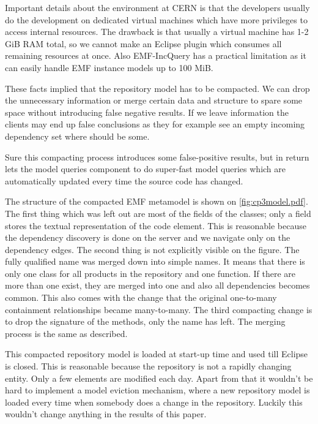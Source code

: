 Important details about the environment at CERN is that the developers usually
do the development on dedicated virtual machines which have more privileges to
access internal resources. The drawback is that usually a virtual machine has
1-2 GiB RAM total, so we cannot make an Eclipse plugin which consumes all
remaining resources at once. Also EMF-IncQuery has a practical limitation as it
can easily handle EMF instance models up to 100 MiB.

These facts implied that the repository model has to be compacted. We can drop
the unnecessary information or merge certain data and structure to spare some
space without introducing false negative results. If we leave information the
clients may end up false conclusions as they for example see an empty incoming
dependency set where should be some. 

Sure this compacting process introduces some false-positive results, but in 
return lets the model queries component to do super-fast model queries which
are automatically updated every time the source code has changed. 

The structure of the compacted EMF metamodel is shown on \autoref{fig:cp3model.pdf}.
The first thing which was left out are most of the fields of the classes; only a
 field stores the textual representation of the code element. This is
reasonable because the dependency discovery is done on the server and we
navigate only on the dependency edges. The second thing is not explicitly
visible on the figure. The fully qualified name was merged down into simple
names. It means that there is only one  class for all products in
the repository and one  function. If there are more than one
exist, they are merged into one and also all dependencies becomes common. This
also comes with the change that the original one-to-many containment
relationships became many-to-many. The third compacting change is to drop the
signature of the methods, only the name has left. The merging process is the
same as described.

This compacted repository model is loaded at start-up time and used till Eclipse
is closed. This is reasonable because the repository is not a rapidly changing
entity. Only a few elements are modified each day. Apart from that it wouldn't
be hard to implement a model eviction mechanism, where a new repository model is
loaded every time when somebody does a change in the repository. Luckily this 
wouldn't change anything in the results of this paper.  

